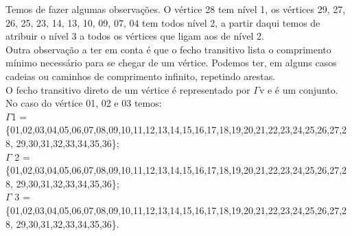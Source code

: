 \indent Temos de fazer algumas observações. O vértice 28 tem nível 1, os vértices 29, 27, 26, 25, 23, 14, 13, 10, 
09, 07, 04 tem todos nível 2, a partir daqui temos de atribuir o nível 3 a todos os vértices que ligam aos de 
nível 2.\\
\indent Outra observação a ter em conta é que o fecho transitivo lista o comprimento mínimo necessário para se 
chegar de um vértice. Podemos ter, em alguns casos cadeias ou caminhos de comprimento infinito, repetindo 
arestas.\\
\indent O fecho transitivo direto de um vértice é representado por $\Gamma$v e é um conjunto. No caso do vértice 01, 02 e 
03 temos:\\
\indent $\Gamma$1 =\\
\{01,02,03,04,05,06,07,08,09,10,11,12,13,14,15,16,17,18,19,20,21,22,23,24,25,26,27,28,
29,30,31,32,33,34,35,36\};\\
\indent $\Gamma$ 2 =\\
\{01,02,03,04,05,06,07,08,09,10,11,12,13,14,15,16,17,18,19,20,21,22,23,24,25,26,27,28,
29,30,31,32,33,34,35,36\};\\
\indent $\Gamma$ 3 =\\
\{01,02,03,04,05,06,07,08,09,10,11,12,13,14,15,16,17,18,19,20,21,22,23,24,25,26,27,28,
29,30,31,32,33,34,35,36\}.
